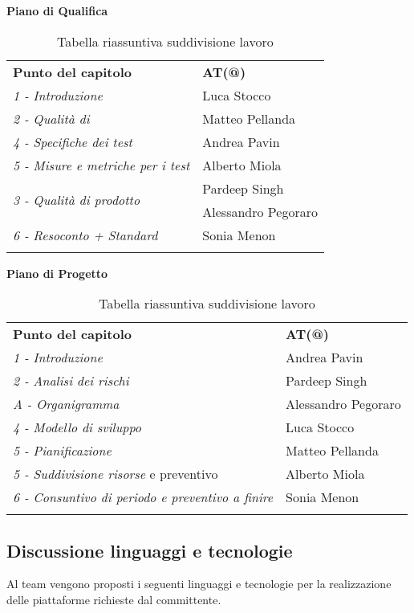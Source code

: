 		\begin{center}
			\textbf{Piano di Qualifica}\\[0.25cm]
			\renewcommand{\arraystretch}{1.5}
			\begin{longtable}{  p{6cm} p{4cm}  }
				\rowcolor{tableHeadYellow}
				\textbf{Punto del capitolo}&\textbf{AT(@)}\\
					\emph{1 - Introduzione} & Luca Stocco  \\ \emph{2 - Qualità di \markg{processo}} & Matteo Pellanda\\
				\hline
				\emph{4 - Specifiche dei test} & Andrea Pavin  \\ \emph{5 - Misure e metriche per i test} & Alberto Miola\\
				\hline
				\multirow{2}{*}{\emph{3 - Qualità di prodotto}} & Pardeep Singh\\&Alessandro Pegoraro\\
				\hline
				\emph{6 - Resoconto + Standard \markg{ISO}} & Sonia Menon\\
				\hline
				\rowcolor{white}
				\caption{Tabella riassuntiva suddivisione lavoro}
			\end{longtable}	
		\end{center}
		\clearpage
		\begin{center}
		\textbf{Piano di Progetto}\\[0.25cm]
		\renewcommand{\arraystretch}{1.5}
		\begin{longtable}{  p{8cm} p{4cm}  }
			\rowcolor{tableHeadYellow}
			\textbf{Punto del capitolo}&\textbf{AT(@)}\\
			\emph{1 - Introduzione} & Andrea Pavin  \\ \emph{2 - Analisi dei rischi} & Pardeep Singh\\ \emph{A - Organigramma} & Alessandro Pegoraro\\
			\hline
			\emph{4 - Modello di sviluppo} & Luca Stocco  \\ \emph{5 - Pianificazione} & Matteo Pellanda\\
			\hline
			\emph{5 - Suddivisione risorse} e preventivo & Alberto Miola\\ \emph{6 - Consuntivo di periodo e preventivo a finire} & Sonia Menon\\
			\hline
			\rowcolor{white}
			\caption{Tabella riassuntiva suddivisione lavoro}
		\end{longtable}	
		\end{center}
	
	
\subsection{Discussione linguaggi e tecnologie}
	Al team vengono proposti i seguenti linguaggi e tecnologie per la realizzazione delle piattaforme richieste dal committente.
	
